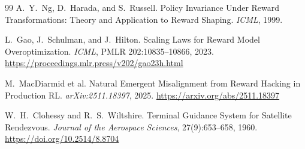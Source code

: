\documentclass[11pt]{article}
\begin{document}
\begin{thebibliography}{99}
 A.~Y.~Ng, D.~Harada, and S.~Russell. Policy Invariance Under
Reward Transformations: Theory and Application to Reward Shaping. \emph{ICML},
1999.

 L.~Gao, J.~Schulman, and J.~Hilton. Scaling Laws for Reward
Model Overoptimization. \emph{ICML}, PMLR 202:10835--10866, 2023.
\url{https://proceedings.mlr.press/v202/gao23h.html}

 M.~MacDiarmid et al. Natural Emergent Misalignment from
Reward Hacking in Production RL. \emph{arXiv:2511.18397}, 2025.
\url{https://arxiv.org/abs/2511.18397}

 W.~H.~Clohessy and R.~S.~Wiltshire. Terminal Guidance System
for Satellite Rendezvous. \emph{Journal of the Aerospace Sciences},
27(9):653--658, 1960. \url{https://doi.org/10.2514/8.8704}

\end{thebibliography}
\end{document}
